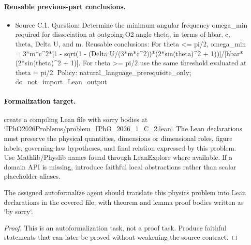 \paragraph{Reusable previous-part conclusions.}
\begin{itemize}
\item Source C.1. Question: Determine the minimum angular frequency omega\_min required for dissociation at outgoing O2 angle theta, in terms of hbar, c, theta, Delta U, and m. Reusable conclusions: For theta <= pi/2, omega\_min = 3*m*c\textasciicircum{}2*[1 - sqrt(1 - (Delta U/(3*m*c\textasciicircum{}2))*(2*sin(theta)\textasciicircum{}2 + 1))]/[hbar*(2*sin(theta)\textasciicircum{}2 + 1)]. For theta >= pi/2 use the same threshold evaluated at theta = pi/2. Policy: natural\_language\_prerequisite\_only; do\_not\_import\_Lean\_output
\end{itemize}

\paragraph{Formalization target.}
create a compiling Lean file with sorry bodies at `IPhO2026Problems/problem\_IPhO\_2026\_1\_C\_2.lean`.
The Lean declarations must preserve the physical quantities, dimensions or dimensional roles, figure labels, governing-law hypotheses, and final relation expressed by this problem.
Use Mathlib/Physlib names found through LeanExplore where available. If a domain API is missing, introduce faithful local abstractions rather than scalar placeholder aliases.

\begin{theorem}
\label{thm:physics:IPhO_2026_1_C_2:target}
The assigned autoformalize agent should translate this physics problem into Lean declarations in the covered file, with theorem and lemma proof bodies written as `by sorry`.
\end{theorem}
\begin{proof}
This is an autoformalization task, not a proof task. Produce faithful statements that can later be proved without weakening the source contract.
\end{proof}

